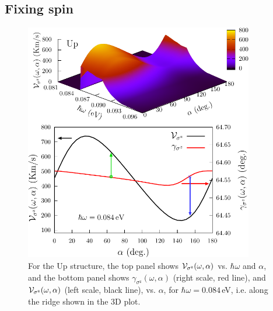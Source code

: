 \documentclass[floatfix,prb,aps,superscriptaddress,showpacs,11pt,preprint,letterpaper]{revtex4}
\def\tama{10cm}
\begin{document}
\subsection{Fixing spin} %
\label{sec:res-fixspin}

\begin{figure}[t]
\centering
\includegraphics[width=\tama]{upplots/up-vsz-w1}
\caption{For the Up structure, the top panel shows ${\cal V}_{\sigma^\mathrm{z}}
(\omega,\alpha)$ vs. $\hbar\omega$ and $\alpha$, and the bottom panel shows
$\gamma_{\sigma^\mathrm{z}}(\omega,\alpha)$ (right scale, red line), and ${\cal
V}_{\sigma^\mathrm{z}}(\omega,\alpha)$ (left scale, black line), vs. $\alpha$,
for $\hbar\omega=0.084$\,eV, i.e. along the ridge shown in the 3D plot. }
\label{fig:up-vsz-w1}
\end{figure}
\end{document}
